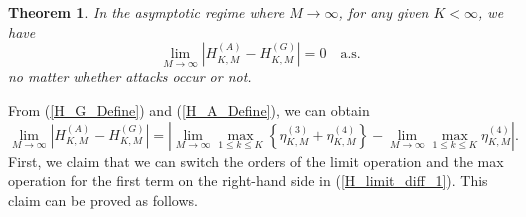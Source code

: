 \documentclass[11pt, draftclsnofoot, onecolumn]{IEEEtran}
\newtheorem{theorem}{Theorem}
\begin{document}
\begin{theorem} \label{Theorem_H_A_H_G}
	In the asymptotic regime where   $M \to \infty$,   for any given $K<\infty$, we have
	\begin{equation}
	\mathop {\lim }\limits_{M \to \infty } \left| {H_{K,M}^{\left( A \right)} - H_{K,M}^{\left( G \right)}} \right| = 0 \quad \text{a.s.}
	\end{equation}
	no matter whether attacks occur or not.
\end{theorem}
\begin{IEEEproof}
From (\ref{H_G_Define}) and (\ref{H_A_Define}), we can obtain
\begin{equation} \label{H_limit_diff_1}
\mathop {\lim }\limits_{M \to \infty } \left| {H_{K,M}^{\left( A \right)} - H_{K,M}^{\left( G \right)}} \right|  = \left| {\mathop {\lim }\limits_{M \to \infty } \mathop {\max }\limits_{1 \le k \le K} \left\{ {\eta _{K,M}^{(3)} + \eta _{K,M}^{(4)}} \right\} -  \mathop {\lim }\limits_{M \to \infty } \mathop {\max }\limits_{1 \le k \le K}  \eta _{K,M}^{(4)}} \right|.
\end{equation}
First, we claim that we can switch the orders of the limit operation and the max operation for the first term on the right-hand side in (\ref{H_limit_diff_1}). This claim can be proved as follows. 


\end{IEEEproof}
\end{document}
